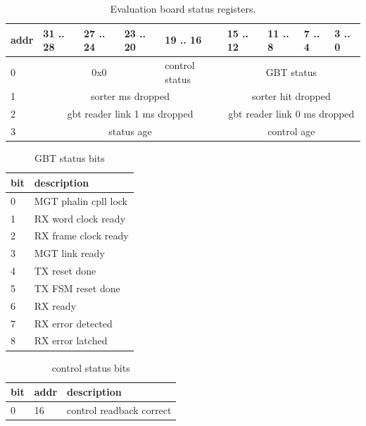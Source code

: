 \documentclass{article}
\begin{document}
\begin{table}[H]
\centering
\begin{tabular}{| l | l | l | l | l | l | l | l | l |}
\hline
addr & 31 .. 28 & 27 .. 24 & 23 .. 20 & 19 .. 16 & 15 .. 12 & 11 .. 8 & 7 .. 4 & 3 .. 0 \\ \hline
0 & \multicolumn{3}{c|}{0x0} & control status  & \multicolumn{4}{c|}{GBT status} \\ \hline
1 & \multicolumn{4}{c|}{sorter ms dropped}  & \multicolumn{4}{c|}{sorter hit dropped} \\ \hline
2 & \multicolumn{4}{c|}{gbt reader link 1 ms dropped}  & \multicolumn{4}{c|}{gbt reader link 0 ms dropped} \\ \hline
3 & \multicolumn{4}{c|}{status age}& \multicolumn{4}{c|}{control age} \\ \hline

\end{tabular}
\caption{Evaluation board status registers.\label{tab13}}
\end{table}

\begin{table}[H]
\centering
\begin{tabular}{| l | l |}
\hline
bit & description \\ \hline
0 & MGT phalin cpll lock \\ \hline
1 & RX word clock ready \\ \hline
2 & RX frame clock ready \\ \hline
3 & MGT link ready \\ \hline
4 & TX reset done \\ \hline
5 & TX FSM reset done \\ \hline
6 & RX ready \\ \hline
7 & RX error detected \\ \hline
8 & RX error latched \\ \hline
\end{tabular}
\caption{GBT status bits\label{tab14}}
\end{table}


\begin{table}[H]
\centering
\begin{tabular}{| l | l | l |}
\hline
bit & addr & description \\ \hline
0 & 16 & control readback correct \\ \hline

\end{tabular}
\caption{control status bits\label{tab14}}
\end{table}
\end{document}

